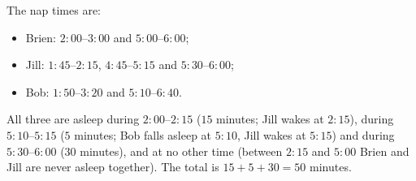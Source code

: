 The nap times are:
\begin{itemize}
\item Brien: $2\!:\!00$--$3\!:\!00$ and $5\!:\!00$--$6\!:\!00$;
\item Jill: $1\!:\!45$--$2\!:\!15$, $4\!:\!45$--$5\!:\!15$ and $5\!:\!30$--$6\!:\!00$;
\item Bob: $1\!:\!50$--$3\!:\!20$ and $5\!:\!10$--$6\!:\!40$.
\end{itemize}
All three are asleep during $2\!:\!00$--$2\!:\!15$ ($15$ minutes; Jill wakes at $2\!:\!15$), during $5\!:\!10$--$5\!:\!15$ ($5$ minutes; Bob falls asleep at $5\!:\!10$, Jill wakes at $5\!:\!15$) and during $5\!:\!30$--$6\!:\!00$ ($30$ minutes), and at no other time (between $2\!:\!15$ and $5\!:\!00$ Brien and Jill are never asleep together). The total is $15+5+30=\boxed{50}$ minutes.
